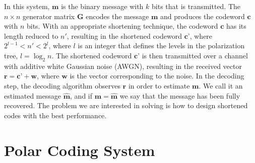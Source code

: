 \documentclass[10pt,twocolumn]{IEEEtran}
\begin{document}
In this system, $\textbf{m}$ is the binary message with $k$ bits
that is transmitted. The $n \times n$ generator matrix $\textbf{G}$
encodes the message $\textbf{m}$ and produces the codeword
$\textbf{c}$ with $n$ bits. With an appropriate shortening
technique, the codeword $\textbf{c}$ has its length reduced to $n'$,
resulting in the shortened codeword $\textbf{c'}$, where $2^{l-1} <
n' < 2^l$, where $l$ is an integer that defines the levels in the
polarization tree, $l=\log_2n$. The shortened codeword $\textbf{c'}$
is then transmitted over a channel with additive white Gaussian
noise (AWGN), resulting in the received vector
$\textbf{r}=\textbf{c'}+\textbf{w}$, where $\textbf{w}$ is the
vector corresponding to the noise. In the decoding step, the
decoding algorithm observes $\textbf{r}$ in order to estimate
$\textbf{m}$. We call it an estimated message $\hat{\textbf{m}}$,
and if $\textbf{m}=\hat{\textbf{m}}$ we say that the message has
been fully recovered. The problem we are interested in solving is
how to design shortened codes with the best performance.

\section{Polar Coding System}
\end{document}
